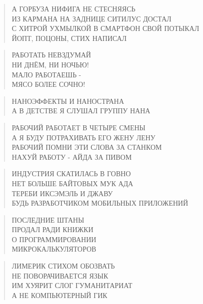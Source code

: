 \poemtitle{***}
\begin{verse}
А ГОРБУЗА НИФИГА НЕ СТЕСНЯЯСЬ\\
ИЗ КАРМАНА НА ЗАДНИЦЕ СИТИЛУС ДОСТАЛ\\
С ХИТРОЙ УХМЫЛКОЙ В СМАРТФОН СВОЙ ПОТЫКАЛ\\
ЙОПТ, ПОЦОНЫ, СТИХ НАПИСАЛ
\end{verse}

\poemtitle{***}
\begin{verse}
РАБОТАТЬ НЕВЗДУМАЙ\\
НИ ДНЁМ, НИ НОЧЬЮ!\\
МАЛО РАБОТАЕШЬ -\\
МЯСО БОЛЕЕ СОЧНО!
\end{verse}

\poemtitle{***}
\begin{verse}
НАНОЭФФЕКТЫ И НАНОСТРАНА\\
А В ДЕТСТВЕ Я СЛУШАЛ ГРУППУ НАНА
\end{verse}

\poemtitle{***}
\begin{verse}
РАБОЧИЙ РАБОТАЕТ В ЧЕТЫРЕ СМЕНЫ\\
А Я БУДУ ПОТРАХИВАТЬ ЕГО ЖЕНУ ЛЕНУ\\
РАБОЧИЙ ПОМНИ ЭТИ СЛОВА ЗА СТАНКОМ\\
НАХУЙ РАБОТУ - АЙДА ЗА ПИВОМ
\end{verse}

\poemtitle{***}
\begin{verse}
ИНДУСТРИЯ СКАТИЛАСЬ В ГОВНО\\
НЕТ БОЛЬШЕ БАЙТОВЫХ МУК АДА\\
ТЕРЕБИ ИКСЭМЭЛЬ И ДЖАВУ\\
БУДЬ РАЗРАБОТЧИКОМ МОБИЛЬНЫХ ПРИЛОЖЕНИЙ
\end{verse}

\poemtitle{***}
\begin{verse}
ПОСЛЕДНИЕ ШТАНЫ\\
ПРОДАЛ РАДИ КНИЖКИ\\
О ПРОГРАММИРОВАНИИ\\
МИКРОКАЛЬКУЛЯТОРОВ
\end{verse}

\poemtitle{***}
\begin{verse}
ЛИМЕРИК СТИХОМ ОБОЗВАТЬ\\
НЕ ПОВОРАЧИВАЕТСЯ ЯЗЫК\\
ИМ ХУЯРИТ СЛОГ ГУМАНИТАРИАТ\\
А НЕ КОМПЬЮТЕРНЫЙ ГИК
\end{verse}


